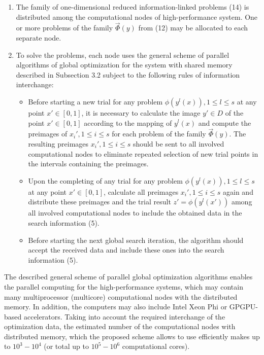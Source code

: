 \documentclass[12pt]{amsart}
\begin{document}
\begin{enumerate}
\item The family of one-dimensional reduced information-linked problems (14) is distributed among the computational nodes of high-performance system. One or more problems of the family $\overrightarrow{\Phi}(y)$ from (12) may be allocated to each separate node.

\item To solve the problems, each node uses the general scheme of parallel algorithms of global optimization for the system with shared memory described in Subsection 3.2 subject to the following rules of information interchange:

\begin{itemize}
\item Before starting a new trial for any problem $\phi(y^l(x)), 1 \leq l \leq s$ at any point $x' \in [0,1]$, it is necessary to calculate the image $y' \in D$ of the point $x' \in [0,1]$ according to the mapping of $y^l(x)$ and compute the preimages of $x_i', 1 \leq i \leq s$ for each problem of the family $\overrightarrow{\Phi}(y)$. The resulting preimages $x_i', 1 \leq i \leq s$ should be sent to all involved computational nodes to eliminate repeated selection of new trial points in the intervals containing the preimages.

\item Upon the completing of any trial for any problem $\phi(y^l(x)), 1 \leq l \leq s$ at any point $x' \in [0,1]$, calculate all preimages $x_i', 1 \leq i \leq s$ again and distribute these preimages and the trial result $z' = \phi(y^l(x'))$ among all involved computational nodes to include the obtained data in the search information (5).

\item Before starting the next global search iteration, the algorithm should accept the received data and include these ones into the search information (5).
\end{itemize}
\end{enumerate}

The described general scheme of parallel global optimization algorithms enables the parallel computing for the high-performance systems, which may contain many multiprocessor (multicore) computational nodes with the distributed memory. In addition, the computers may also include Intel Xeon Phi or GPGPU-based accelerators. Taking into account the required interchange of the optimization data, the estimated number of the computational nodes with distributed memory, which the proposed scheme allows to use efficiently makes up to $10^3-10^4$ (or total up to $10^5-10^6$ computational cores). 
\end{document}
